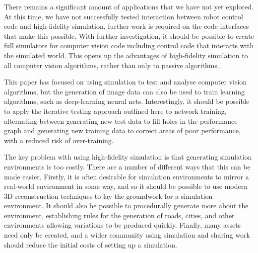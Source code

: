 \documentclass[letterpaper, 10 pt, conference]{ieeeconf}  %
\begin{document}
There remains a significant amount of applications that we have not yet explored. At this time, we have not successfully tested interaction between robot control code and high-fidelity simulation, further work is required on the code interfaces that make this possible. With further investigation, it should be possible to create full simulators for computer vision code including control code that interacts with the simulated world. This opens up the advantages of high-fidelity simulation to all computer vision algorithms, rather than only to passive algorithms.

This paper has focused on using simulation to test and analyse computer vision algorithms, but the generation of image data can also be used to train learning algorithms, such as deep-learning neural nets. Interestingly, it should be possible to apply the iterative testing approach outlined here to network training, alternating between generating new test data to fill holes in the performance graph and generating new training data to correct areas of poor performance, with a reduced risk of over-training.

The key problem with using high-fidelity simulation is that generating simulation environments is too costly. There are a number of different ways that this can be made easier. Firstly, it is often desirable for simulation environments to mirror a real-world environment in some way, and so it should be possible to use modern 3D reconstruction techniques to lay the groundwork for a simulation environment. It should also be possible to procedurally generate more about the environment, establishing rules for the generation of roads, cities, and other environments allowing variations to be produced quickly. Finally, many assets need only be created, and a wider community using simulation and sharing work should reduce the initial costs of setting up a simulation.

\addtolength{\textheight}{-12cm}   %

\end{document}
